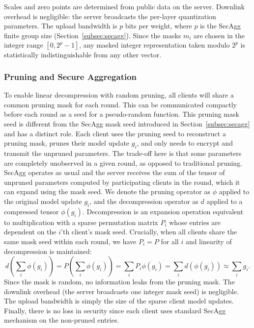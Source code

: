 \documentclass[11pt]{article}
\newcommand{\SecAgg}{{\sc SecAgg}\xspace}
\newcommand{\modif}[1]{{\color{black}#1}}
\begin{document}
\modif{} Scales and zero points are determined from public data on the server. Downlink overhead is negligible: the server broadcasts the per-layer quantization parameters. The upload bandwidth is $p$ bits per weight, where $p$ is the \SecAgg finite group size (Section~\ref{subsec:secagg}). \modif{Since the masks $m_i$ are chosen in the integer range $[0, 2^p-1]$, any masked integer representation taken modulo $2^p$ is statistically indistinguishable from any other vector.}

\subsubsection{Pruning and Secure Aggregation}

To enable linear decompression with random pruning, all clients will share a common pruning mask for each round.
This can be communicated compactly before each round as a seed for a pseudo-random function.
This pruning mask seed is different from the \SecAgg mask seed introduced in Section~\ref{subsec:secagg} and has a distinct role.
Each client uses the pruning seed to reconstruct a pruning mask, prunes their model update $g_i$, and only needs to encrypt and transmit the unpruned parameters.
The trade-off here is that some parameters are completely unobserved in a given round, as opposed to traditional pruning.
\SecAgg operates as usual and the server receives the sum of the tensor of unpruned parameters computed by participating clients in the round, which it can expand using the mask seed.
We denote the pruning operator as $\phi$ applied to the original model update $g_i$, and the decompression operator as $d$ applied to a compressed tensor $\phi(g_i)$. Decompression is an expansion operation equivalent to multiplication with a sparse permutation matrix $P_i$ whose entries are dependent on the $i$'th client's mask seed.
Crucially, when all clients share the same mask seed within each round, we have $P_i = P$ for all $i$ and linearity of decompression is maintained:
\begin{equation*} \textstyle
    d \left(\sum_i \phi(g_i) \right) = P \left( \sum_i \phi(g_i) \right) = \sum_i P_i\phi(g_i) = \sum_i d(\phi(g_i)) \approx \sum_i g_i.
\end{equation*}
%
\modif{} Since the mask is random, no information leaks from the pruning mask. The downlink overhead (the server broadcasts one integer mask seed) is negligible. The upload bandwidth is simply the size of the sparse client model updates. \modif{Finally, there is no loss in security since each client uses standard \SecAgg mechanism on the non-pruned entries.}
\end{document}
